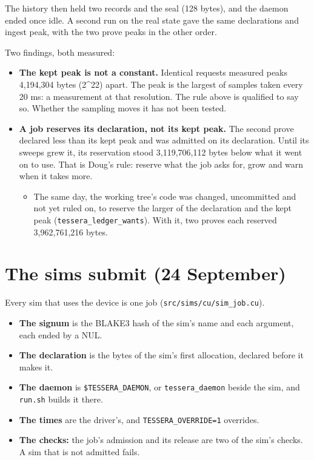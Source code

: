The history then held two records and the seal (128 bytes), and the daemon ended once idle. A second run on the real state gave the same declarations and ingest peak, with the two prove peaks in the other order.

Two findings, both measured:

\begin{itemize}
\item \textbf{The kept peak is not a constant.} Identical requests measured peaks 4,194,304 bytes (2\textasciicircum{}22) apart. The peak is the largest of samples taken every 20 ms: a measurement at that resolution. The rule above is qualified to say so. Whether the sampling moves it has not been tested.
\item \textbf{A job reserves its declaration, not its kept peak.} The second prove declared less than its kept peak and was admitted on its declaration. Until its sweeps grew it, its reservation stood 3,119,706,112 bytes below what it went on to use. That is Doug's rule: reserve what the job asks for, grow and warn when it takes more.

\begin{itemize}
\item The same day, the working tree's code was changed, uncommitted and not yet ruled on, to reserve the larger of the declaration and the kept peak (\texttt{tessera\_\allowbreak{}ledger\_\allowbreak{}wants}). With it, two proves each reserved 3,962,761,216 bytes.
\end{itemize}
\end{itemize}

\section{\texorpdfstring{The sims submit (24 September)}{The sims submit (24 September)}}

Every sim that uses the device is one job (\texttt{src/\allowbreak{}sims/\allowbreak{}cu/\allowbreak{}sim\_\allowbreak{}job.\allowbreak{}cu}).

\begin{itemize}
\item \textbf{The signum} is the BLAKE3 hash of the sim's name and each argument, each ended by a NUL.
\item \textbf{The declaration} is the bytes of the sim's first allocation, declared before it makes it.
\item \textbf{The daemon} is \texttt{\$TESSERA\_\allowbreak{}DAEMON}, or \texttt{tessera\_\allowbreak{}daemon} beside the sim, and \texttt{run.\allowbreak{}sh} builds it there.
\item \textbf{The times} are the driver's, and \texttt{TESSERA\_\allowbreak{}OVERRIDE=1} overrides.
\item \textbf{The checks:} the job's admission and its release are two of the sim's checks. A sim that is not admitted fails.
\end{itemize}

